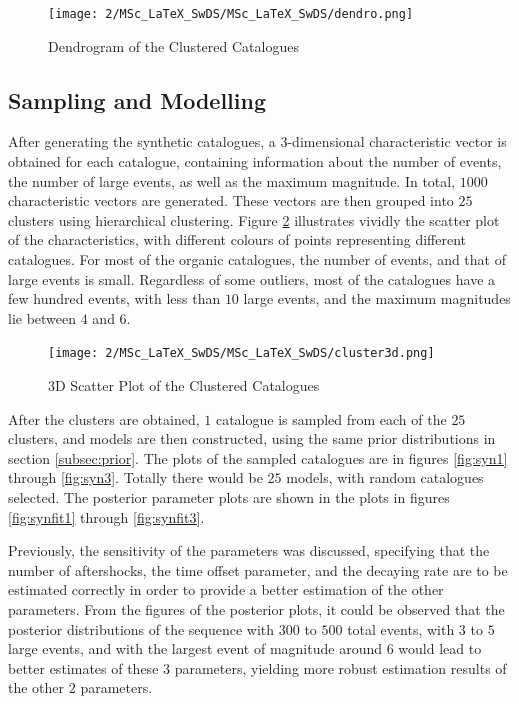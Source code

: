 \documentclass[11pt,twoside]{article}
\numberwithin{Theorem}{section}
\numberwithin{Definition}{section}
\numberwithin{Lemma}{section}
\numberwithin{Algorithm}{section}
\numberwithin{equation}{section}
\begin{document}
\begin{figure}[h]
\centering
\texttt{[image: 2/MSc\_LaTeX\_SwDS/MSc\_LaTeX\_SwDS/dendro.png]}
\caption{Dendrogram of the Clustered Catalogues}
\label{fig:dendro}
\end{figure}

\subsection{Sampling and Modelling}
After generating the synthetic catalogues, a $3$-dimensional characteristic vector is obtained for each catalogue, containing information about the number of events, the number of large events, as well as the maximum magnitude. In total, $1000$ characteristic vectors are generated. These vectors are then grouped into $25$ clusters using hierarchical clustering. Figure \ref{fig:3d}  illustrates vividly the scatter plot of the characteristics, with different colours of points representing different catalogues. For most of the organic catalogues, the number of events, and that of large events is small. Regardless of some outliers, most of the catalogues have a few hundred events, with less than $10$ large events, and the maximum magnitudes lie between $4$ and $6$. 

\begin{figure}[h]
\centering
\texttt{[image: 2/MSc\_LaTeX\_SwDS/MSc\_LaTeX\_SwDS/cluster3d.png]}
\caption{3D Scatter Plot of the Clustered Catalogues}
\label{fig:3d}
\end{figure}

After the clusters are obtained, $1$ catalogue is sampled from each of the $25$ clusters, and models are then constructed, using the same prior distributions in section \ref{subsec:prior}. The plots of the sampled catalogues are in figures \ref{fig:syn1} through \ref{fig:syn3}. Totally there would be $25$ models, with random catalogues selected. The posterior parameter plots are shown in the plots in figures \ref{fig:synfit1} through \ref{fig:synfit3}.

Previously, the sensitivity of the parameters was discussed, specifying that the number of aftershocks, the time offset parameter, and the decaying rate are to be estimated correctly in order to provide a better estimation of the other parameters. From the figures of the posterior plots, it could be observed that the posterior distributions of the sequence with $300$ to $500$ total events, with $3$ to $5$ large events, and with the largest event of magnitude around $6$ would lead to better estimates of these $3$ parameters, yielding more robust estimation results of the other $2$ parameters.
\end{document}
